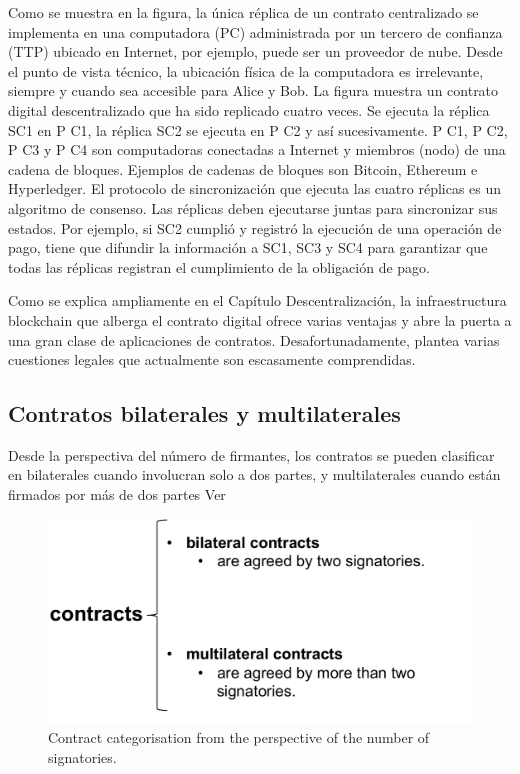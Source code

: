 \documentclass[12pt]{report} %
\begin{document}
Como se muestra en la figura, la única réplica de un contrato centralizado se implementa en una computadora (PC) administrada por un tercero de confianza (TTP) ubicado en Internet, por ejemplo, puede ser un proveedor de nube. Desde el punto de vista técnico, la ubicación física de la computadora es irrelevante, siempre y cuando sea accesible para Alice y Bob. La figura muestra un contrato digital descentralizado que ha sido replicado cuatro veces. Se ejecuta la réplica SC1 en P C1, la réplica SC2 se ejecuta en P C2 y así sucesivamente. P C1, P C2, P C3 y P C4 son computadoras conectadas a Internet y miembros (nodo) de una cadena de bloques. Ejemplos de cadenas de bloques
son Bitcoin, Ethereum e Hyperledger. El protocolo de sincronización que ejecuta las cuatro réplicas es un algoritmo de consenso. Las réplicas deben ejecutarse juntas para sincronizar sus estados. Por ejemplo, si SC2 cumplió y registró la ejecución de una operación de pago, tiene que difundir la información a SC1, SC3 y SC4 para garantizar que todas las réplicas registran el cumplimiento de la obligación de pago.

Como se explica ampliamente en el Capítulo Descentralización, la infraestructura blockchain que alberga el contrato digital ofrece varias ventajas y abre la puerta a una gran clase de aplicaciones de contratos. Desafortunadamente, plantea varias cuestiones legales que actualmente son escasamente comprendidas.

\subsection{Contratos bilaterales y multilaterales}

Desde la perspectiva del número de firmantes, los contratos se pueden clasificar en bilaterales cuando involucran solo a dos partes, y multilaterales cuando están firmados por más de dos partes Ver

\begin{figure}
\centering
\includegraphics[width=0.65\columnwidth]{figures/contcatebimulti.pdf}
\caption{Contract categorisation from the perspective of the number of signatories.}
\label{fig:contcatebimulti}
\end{figure}
\end{document}

